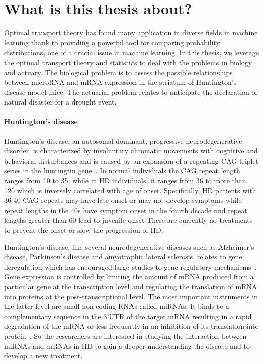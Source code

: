 \section{What is this thesis about?}

Optimal transport theory has found many application in diverse fields in machine learning thank to 
providing a powerful tool for comparing probability distributions, one of a crucial issue
in machine learning.  In this thesis, we leverage the optimal transport theory and statistics to deal with 
the problems in biology and actuary. The biological problem is to assess the possible relationships between microRNA and mRNA expression in the striatum of Huntington's disease model mice. The actuarial problem relates to anticipate the declaration of natural disaster for a drought event. 

\paragraph{ Huntington’s disease\\}
Huntington's disease, an autosomal-dominant, progressive neurodegenerative disorder, is characterized by involuntary chromatic movements with cognitive and behavioral disturbances and is caused by an expansion of a repeating CAG triplet series in the huntingtin gene~\cite{HD2007, MACDONALD1993971}.   In normal individuals the CAG repeat length ranges from 10 to 35, while in HD individuals, it ranges from 36 to more than 120 which is inversely correlated with age of onset. Specifically, HD patients with 36-40 CAG repeats may have late onset or may not develop symptoms while repeat lengths in the 40s have symptom onset in the fourth decade and repeat lengths greater than 60 lead to juvenile onset \cite{Andrew1993}
There are currently no treatments to prevent the onset or slow the progression of HD.

Huntington's disease, like several neurodegenerative diseases such as Alzheimer's disease, Parkinson's disease and amyotrophic lateral sclerosis, relates to gene deregulation which has encouraged large studies to gene regulatory mechanisms~\cite{Langfelder2018}.
Gene expression is controlled by limiting the amount of mRNA produced from a particular gene at the transcription level and regulating the translation of mRNA into proteins at the post-transcriptional level. The most important instruments in the latter level  are small non-coding RNAs called miRNAs. It binds to a complementary sequence in the 3'UTR of the target mRNA resulting in a rapid degradation of the mRNA or less frequently in an inhibition of its translation into protein~\cite{Pasquinelli12}. So the researchers are interested in studying the interaction between miRNAs and mRNAs in HD to gain a deeper understanding the disease and to develop a new treatment.

